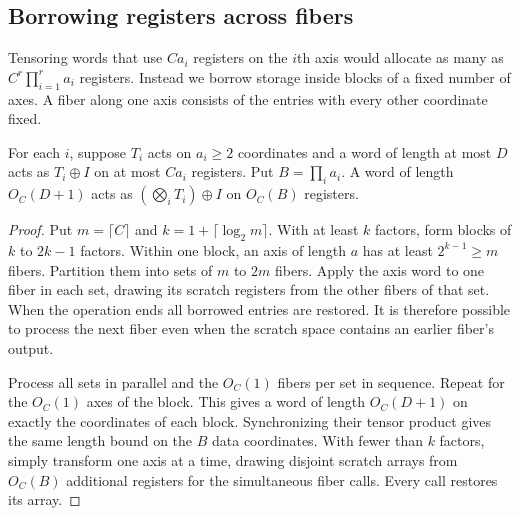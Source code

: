 \subsection{Borrowing registers across fibers}

Tensoring words that use \(Ca_i\) registers on the \(i\)th axis would
allocate as many as \(C^r\prod_{i=1}^r a_i\) registers. Instead we
borrow storage inside blocks of a fixed number of axes. A fiber along
one axis consists of the entries with every other coordinate fixed.

\begin{lemma}\label{up:fibers}
For each \(i\), suppose \(T_i\) acts on \(a_i\ge2\) coordinates and
a word of length at most \(D\) acts as \(T_i\oplus I\) on at most
\(Ca_i\) registers. Put \(B=\prod_i a_i\). A word of length
\(O_C(D+1)\) acts as \((\bigotimes_i T_i)\oplus I\) on \(O_C(B)\)
registers.
\end{lemma}

\begin{proof}
Put \(m=\lceil C\rceil\) and \(k=1+\lceil\log_2 m\rceil\). With at
least \(k\) factors, form blocks of \(k\) to \(2k-1\) factors. Within
one block, an axis of length \(a\) has at least \(2^{k-1}\ge m\)
fibers. Partition them into sets of \(m\) to \(2m\) fibers. Apply the
axis word to one fiber in each set, drawing its scratch registers from
the other fibers of that set. When the operation ends all borrowed
entries are restored. It is therefore possible to process the next
fiber even when the scratch space contains an earlier fiber's output.

Process all sets in parallel and the \(O_C(1)\) fibers per set in
sequence. Repeat for the \(O_C(1)\) axes of the block. This gives a
word of length \(O_C(D+1)\) on exactly the coordinates of each block.
Synchronizing their tensor product gives the same length bound on the
\(B\) data coordinates. With fewer than \(k\) factors, simply transform
one axis at a time, drawing disjoint scratch arrays from \(O_C(B)\)
additional registers for the simultaneous fiber calls. Every call
restores its array.
\end{proof}
